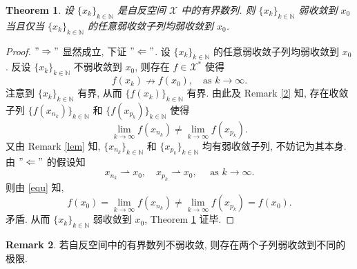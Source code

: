 \documentclass[a4paper,11pt]{article}
\newtheorem{theorem}{Theorem}[section]
\theoremstyle{definition}
\newtheorem{remark}[theorem]{Remark}
\begin{document}
\begin{CJK*}{UTF8}{gbsn}
\begin{theorem} \label{thm2}
    设 $ \{x_k\}_{k \in \mathbb{N}} $ 是自反空间 $ \mathcal{X} $ 中的有界数列. 则
    $ \{x_k\}_{k \in \mathbb{N}} $ 弱收敛到 $ x_0 $ 当且仅当 
    $ \{x_k\}_{k \in \mathbb{N}} $ 的任意弱收敛子列均弱收敛到 $ x_0 $.
\end{theorem}

\begin{proof}
    $ "\Rightarrow" $ 显然成立, 下证 $ "\Leftarrow" $. 
    设 $ \{x_k\}_{k \in \mathbb{N}} $ 的任意弱收敛子列均弱收敛到 $ x_0 $.
    反设 $ \{x_k\}_{k \in \mathbb{N}} $ 不弱收敛到 $ x_0 $, 
    则存在 $ f \in \mathcal{X}^* $ 使得
    $$
        f(x_k) \nrightarrow f(x_0), \quad \text{as } k \to \infty.
    $$
    注意到 $ \{x_k\}_{k \in \mathbb{N}} $ 有界, 从而 $ \{f(x_k)\}_{k \in \mathbb{N}} $ 有界. 
    由此及 Remark \ref{2} 知, 存在收敛子列 $ \{f(x_{n_k})\}_{k \in \mathbb{N}} $ 
    和 $ \{f(x_{p_k})\}_{k \in \mathbb{N}} $ 使得
    \begin{equation} \label{equ}
        \lim_{k \to \infty} f(x_{n_k}) \neq \lim_{k \to \infty} f(x_{p_k}).
    \end{equation}
    又由 Remark \ref{lem} 知, $ \{x_{n_k}\}_{k \in \mathbb{N}} $ 和 $ \{x_{p_k}\}_{k \in \mathbb{N}} $
    均有弱收敛子列, 不妨记为其本身. 由 $ "\Leftarrow" $ 的假设知
    $$
        x_{n_k} \rightharpoonup x_0, \quad 
        x_{p_k} \rightharpoonup x_0, \quad \text{ as } k \to \infty.
    $$
    则由 \eqref{equ} 知,
    $$
        f(x_0) = \lim_{k \to \infty} f(x_{n_k}) 
               \neq \lim_{k \to \infty} f(x_{p_k}) 
               = f(x_0).
    $$
    矛盾. 从而 $ \{x_k\}_{k \in \mathbb{N}} $ 弱收敛到 $ x_0 $, Theorem \ref{thm2} 证毕.
\end{proof}

\begin{remark}
    若自反空间中的有界数列不弱收敛, 则存在两个子列弱收敛到不同的极限.
\end{remark}

\end{CJK*}
\end{document}
